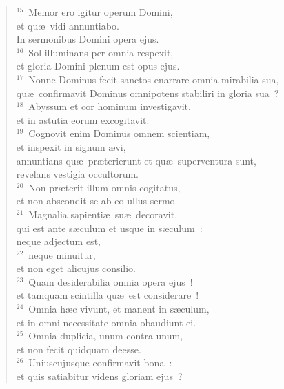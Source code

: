 \begin{flushleft}\begin{verse}${}^{15}$~Memor ero igitur operum Domini,\\ et qu\ae\ vidi annuntiabo.\\ In sermonibus Domini opera ejus.\\
${}^{16}$~Sol illuminans per omnia respexit,\\ et gloria Domini plenum est opus ejus.\\
${}^{17}$~Nonne Dominus fecit sanctos enarrare omnia mirabilia sua,\\ qu\ae\ confirmavit Dominus omnipotens stabiliri in gloria sua~?\\
${}^{18}$~Abyssum et cor hominum investigavit,\\ et in astutia eorum excogitavit.\\
${}^{19}$~Cognovit enim Dominus omnem scientiam,\\ et inspexit in signum \ae vi,\\ annuntians qu\ae\ pr\ae terierunt et qu\ae\ superventura sunt,\\ revelans vestigia occultorum.\\
${}^{20}$~Non pr\ae terit illum omnis cogitatus,\\ et non abscondit se ab eo ullus sermo.\\
${}^{21}$~Magnalia sapienti\ae\ su\ae\ decoravit,\\ qui est ante s\ae culum et usque in s\ae culum~:\\ neque adjectum est,\\
${}^{22}$~neque minuitur,\\ et non eget alicujus consilio.\\
${}^{23}$~Quam desiderabilia omnia opera ejus~!\\ et tamquam scintilla qu\ae\ est considerare~!\\
${}^{24}$~Omnia h\ae c vivunt, et manent in s\ae culum,\\ et in omni necessitate omnia obaudiunt ei.\\
${}^{25}$~Omnia duplicia, unum contra unum,\\ et non fecit quidquam deesse.\\
${}^{26}$~Uniuscujusque confirmavit bona~:\\ et quis satiabitur videns gloriam ejus~?\end{verse}\end{flushleft}


